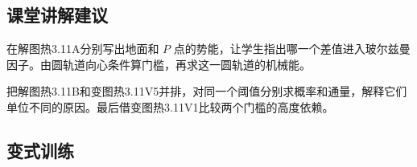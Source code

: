 \documentclass[UTF8,fontset=fandol,a4paper,11pt]{ctexart}
\begin{document}


\subsection*{课堂讲解建议}

在解图热3.11A分别写出地面和 $P$ 点的势能，让学生指出哪一个差值进入玻尔兹曼因子。由圆轨道向心条件算门槛，再求这一圆轨道的机械能。

把解图热3.11B和变图热3.11V5并排，对同一个阈值分别求概率和通量，解释它们单位不同的原因。最后借变图热3.11V1比较两个门槛的高度依赖。



\subsection*{变式训练}
\end{document}
